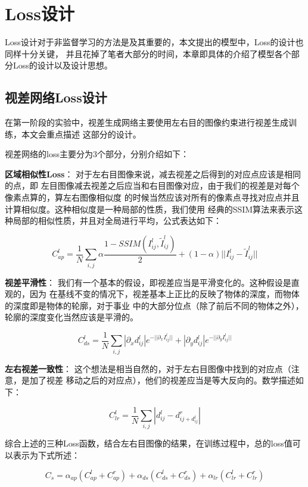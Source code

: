 \chapter{Loss设计}
\label{cha:china}

Loss设计对于非监督学习的方法是及其重要的，本文提出的模型中，Loss的设计也同样十分关键，
并且花掉了笔者大部分的时间，本章即具体的介绍了模型各个部分Loss的设计以及设计思想。

\section{视差网络Loss设计}

在第一阶段的实验中，视差生成网络主要使用左右目的图像约束进行视差生成训练，本文会重点描述
这部分的设计。

视差网络的loss主要分为3个部分，分别介绍如下：

\textbf{区域相似性Loss}： 对于左右目图像来说，减去视差之后得到的对应点应该是相同的点，即
左目图像减去视差之后应当和右目图像对应，由于我们的视差是对每个像素点算的，算左右图像相似度
的时候当然应该对所有的像素点寻找对应点并且计算相似度。这种相似度是一种局部的性质，我们使用
经典的SSIM算法\cite{wang2004image}来表示这种局部的相似性质，并且对全局进行平均，公式表达如下：

$$ C_{ap}^{l} = \frac{1}{N}\sum_{i,j} \alpha \frac{1-SSIM(I_{ij}^l, \widetilde{I}_{ij}^l)}{2} + 
                (1 - \alpha)||I_{ij}^l - \widetilde{I}_{ij}^l|| $$
                

\textbf{视差平滑性}： 我们有一个基本的假设，即视差应当是平滑变化的。这种假设是直观的，因为
在基线不变的情况下，视差基本上正比的反映了物体的深度，而物体的深度即是物体的轮廓，对于事业
中的大部分位点（除了前后不同的物体之外），轮廓的深度变化当然应该是平滑的。

$$ C_{ds}^{l} = \frac{1}{N}\sum_{i,j}|\partial_xd_{ij}^l|e^{-||\partial_xI_{ij}^l||} +
                |\partial_y d_{ij}^l|e^{-||\partial_y I_{ij}^l||}  $$
                
\textbf{左右视差一致性}： 这个想法是相当自然的，对于左右目图像中找到的对应点（注意，是加了视差
移动之后的对应点），他们的视差应当是等大反向的。数学描述如下：

$$ C_{lr}^l = \frac{1}{N} \sum_{i,j}|d_{ij}^l - d_{ij + d_{ij}^l}^r| $$

综合上述的三种Loss函数，结合左右目图像的结果，在训练过程中，总的loss值可以表示为下式所述：

$$ C_s = \alpha_{ap}(C_{ap}^l + C_{ap}^r) +
         \alpha_{ds}(C_{ds}^l + C_{ds}^r) +
         \alpha_{lr}(C_{lr}^l + C_{lr}^r)   $$

